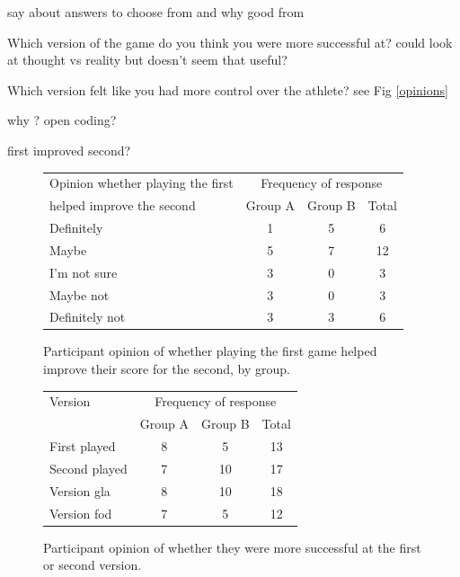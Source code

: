 \documentclass[12pt,a4paper,twoside,openright]{report}
\begin{document}
say about answers to choose from and why good from

Which version of the game do you think you were more successful at?
could look at thought vs reality but doesn't seem that useful?

Which version felt like you had more control over the athlete?
see Fig \ref{opinions} 

why ? open coding?

first improved second?

\begin{figure}[tbh]
\begin{center}
\begin{tabular}{ |p{6cm}|c|c|c| }
  \hline
Opinion whether playing the first& \multicolumn{3}{|c|}{Frequency of response} \\ \cline{2-4}
helped improve the second& Group A& Group B&Total\\ \hline
Definitely     & 1 & 5 & 6 \\ \hline
Maybe          & 5 & 7 & 12\\ \hline
I'm not sure   & 3 & 0 & 3 \\ \hline
Maybe not      & 3 & 0 & 3 \\ \hline
Definitely not & 3 & 3 & 6 \\ \hline
\end{tabular}
\end{center}
\caption{Participant opinion of whether playing the first game helped improve their score for the second, by group.}
\label{firstHelpedSecond}
\end{figure}


\begin{figure}[tbh]
\begin{center}
\begin{tabular}{ |p{6cm}|c|c|c| }
  \hline
Version& \multicolumn{3}{|c|}{Frequency of response} \\ \cline{2-4}
& Group A& Group B&Total\\ \hline\hline
First played   & 8 & 5  & 13 \\ \hline
Second played  & 7 & 10 & 17 \\ \hline\hline
Version gla    & 8 & 10 & 18 \\ \hline
Version fod    & 7 & 5  & 12 \\ \hline
\end{tabular}
\end{center}
\caption{Participant opinion of whether they were more successful at the first or second version.}
\label{successfull}
\end{figure}
\end{document}
